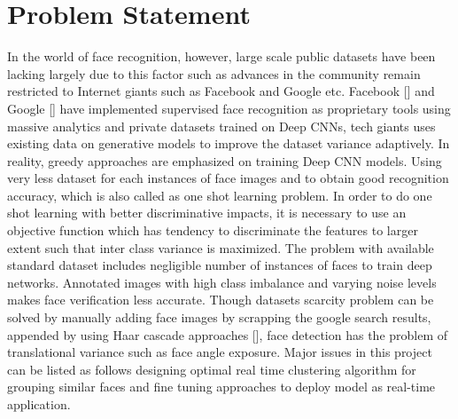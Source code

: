 \documentclass[a4paper,12pt, twoside]{NITKReport}
\begin{document}
\section{Problem Statement}
\label{prob}
	 In the world of face recognition, however, large scale public datasets have been lacking largely due to this factor such as advances in the community remain restricted to Internet giants such as Facebook and Google etc. Facebook [\cite{1}] and Google [\cite{2}] have implemented supervised face recognition as proprietary tools using massive analytics and private datasets trained on Deep CNNs, tech giants uses existing data on generative models to improve the dataset variance adaptively. In reality, greedy approaches are emphasized on training Deep CNN models. Using very less dataset for each instances of face images and to obtain good recognition accuracy, which is also called as one shot learning problem. In order to do one shot learning with better discriminative impacts, it is necessary to use an objective function which has tendency to discriminate the features to larger extent such that inter class variance is maximized. The problem with available standard dataset includes negligible number of instances of faces to train deep networks. Annotated images with high class imbalance and varying noise levels makes face verification less accurate. Though datasets scarcity problem can be solved by manually adding face images by scrapping the google search results, appended by using Haar cascade approaches [\cite{viola2001rapid}], face detection has the problem of translational variance such as face angle exposure. Major issues in this project can be listed as follows designing optimal real time clustering algorithm for grouping similar faces and fine tuning approaches to deploy model as real-time application.

		
\end{document}
